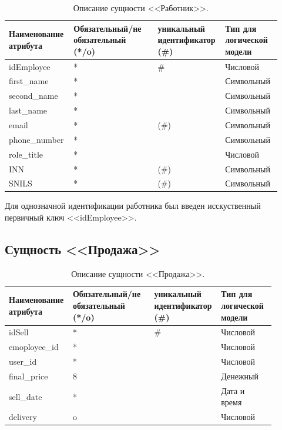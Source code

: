 \documentclass[14pt]{extreport}
\begin{document}
        \begin{table}[H]
            \caption{Описание сущности <<Работник>>.}

            \begin{tabular}{|p{0.225\linewidth}|p{0.3\linewidth}|p{0.2\linewidth}|p{0.2\linewidth}|}
                \hline
                Наименование атрибута & Обязательный/не обязательный (*/o) & уникальный идентификатор (\#) & Тип для логической модели
                \\ \hline
                idEmployee & * & \# & Числовой \\ \hline
                first\_name & * & & Символьный\\ \hline
                second\_name & * & & Символьный\\ \hline
                last\_name & * & & Символьный \\ \hline
                email & * & (\#) & Символьный  \\ \hline
                phone\_number & * & & Символьный\\ \hline
                role\_title & * & & Числовой \\ \hline
                INN & * & (\#) & Символьный \\ \hline
                SNILS & * & (\#) & Символьный \\ \hline 
            \end{tabular}

        \end{table}
        
        Для однозначной идентификации работника был введен исскуственный первичный ключ <<idEmployee>>.


    \subsection*{Сущность <<Продажа>>}

        \begin{table}[H]
            \caption{Описание сущности <<Продажа>>.}

            \begin{tabular}{|p{0.2\linewidth}|p{0.3\linewidth}|p{0.2\linewidth}|p{0.2\linewidth}|}
                \hline
                Наименование атрибута & Обязательный/не обязательный (*/o) & уникальный идентификатор (\#) & Тип для логической модели
                \\ \hline
                idSell & * & \# & Числовой \\ \hline
                emoployee\_id & * & & Числовой\\ \hline
                user\_id & * & & Числовой\\ \hline
                final\_price & 8 & & Денежный \\ \hline
                sell\_date & * & & Дата и время \\ \hline  
                delivery & o & & Числовой \\ \hline
            \end{tabular}
        \end{table}
\end{document}
